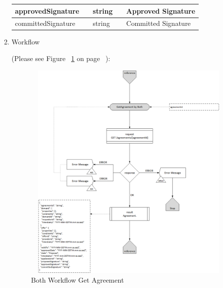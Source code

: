 \begin{enumerate}
\begin{center}
\begin{tabular}{|p{3cm}|l|p{3cm}|p{3cm}|p{4cm}|}
approvedSignature &		&  string			&			&  Approved Signature \\
\hline  
  
committedSignature &	& 	string			&			&	Committed Signature \\
\hline

\end{tabular}
\end{center}


\item Workflow

(Please see Figure ~\ref{fig:BGA} on page ~\pageref{fig:BGA}):

\begin{figure}[htbp]
    \centering
    \includegraphics[width=11cm,height=11cm,angle=0]{./diag/Workflow/Market/GetAgreement-B-Workflow.png}
    \caption{Both Workflow Get Agreement }
	\label{fig:BGA}
\end{figure}

\end{enumerate}

\newpage


